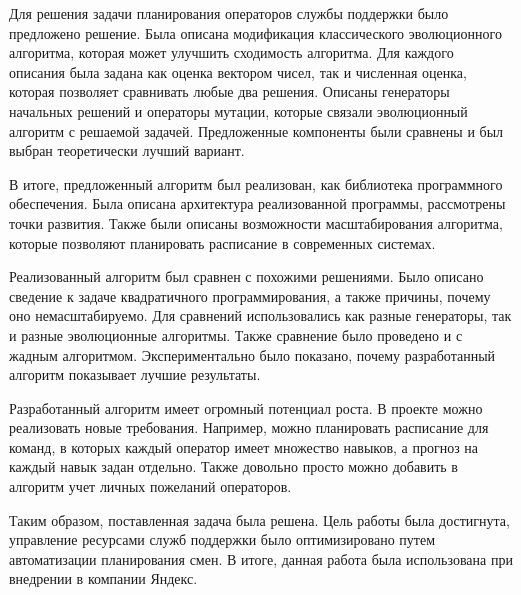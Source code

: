 \documentclass[times,specification,annotation]{itmo-student-thesis}
\begin{document}
Для решения задачи планирования операторов службы поддержки было предложено решение.
Была описана модификация классического эволюционного алгоритма, которая может улучшить сходимость алгоритма.
Для каждого описания была задана как оценка вектором чисел, так и численная оценка, которая позволяет сравнивать любые два решения.
Описаны генераторы начальных решений и операторы мутации, которые связали эволюционный алгоритм с решаемой задачей.
Предложенные компоненты были сравнены и был выбран теоретически лучший вариант.

В итоге, предложенный алгоритм был реализован, как библиотека программного обеспечения.
Была описана архитектура реализованной программы, рассмотрены точки развития.
Также были описаны возможности масштабирования алгоритма, которые позволяют планировать расписание в современных системах.

Реализованный алгоритм был сравнен с похожими решениями.
Было описано сведение к задаче квадратичного программирования, а также причины, почему оно немасштабируемо.
Для сравнений использовались как разные генераторы, так и разные эволюционные алгоритмы.
Также сравнение было проведено и с жадным алгоритмом.
Экспериментально было показано, почему разработанный алгоритм показывает лучшие результаты.

Разработанный алгоритм имеет огромный потенциал роста.
В проекте можно реализовать новые требования.
Например, можно планировать расписание для команд, в которых каждый оператор имеет множество навыков, а прогноз на каждый навык задан отдельно.
Также довольно просто можно добавить в алгоритм учет личных пожеланий операторов.

Таким образом, поставленная задача была решена.
Цель работы была достигнута, управление ресурсами служб поддержки было оптимизировано путем автоматизации планирования смен.
В итоге, данная работа была использована при внедрении в компании Яндекс.

\printmainbibliography
\end{document}
